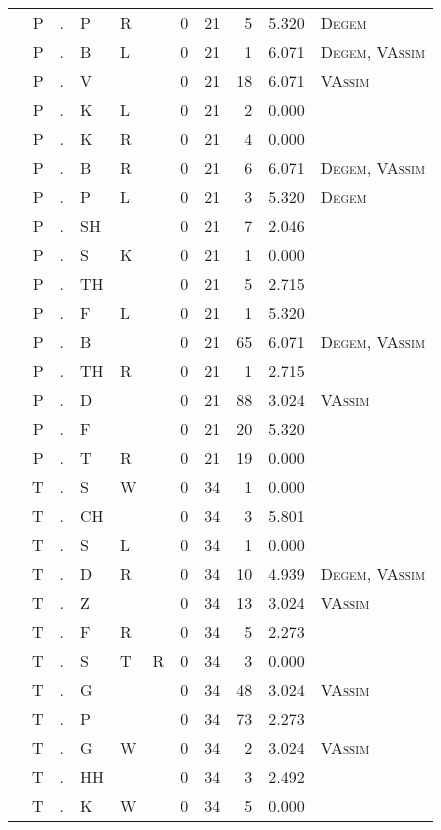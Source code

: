 \begin{longtable}{r@{ } r@{ } c@{ } l@{ } l@{ } l@{ } r r r r l }
 & P & . & P & R &  & 0 & 21 & 5 & 5.320 & \textsc{Degem} \\
 & P & . & B & L &  & 0 & 21 & 1 & 6.071 & \textsc{Degem}, \textsc{VAssim} \\
 & P & . & V &  &  & 0 & 21 & 18 & 6.071 & \textsc{VAssim} \\
 & P & . & K & L &  & 0 & 21 & 2 & 0.000 &  \\
 & P & . & K & R &  & 0 & 21 & 4 & 0.000 &  \\
 & P & . & B & R &  & 0 & 21 & 6 & 6.071 & \textsc{Degem}, \textsc{VAssim} \\
 & P & . & P & L &  & 0 & 21 & 3 & 5.320 & \textsc{Degem} \\
 & P & . & SH &  &  & 0 & 21 & 7 & 2.046 &  \\
 & P & . & S & K &  & 0 & 21 & 1 & 0.000 &  \\
 & P & . & TH &  &  & 0 & 21 & 5 & 2.715 &  \\
 & P & . & F & L &  & 0 & 21 & 1 & 5.320 &  \\
 & P & . & B &  &  & 0 & 21 & 65 & 6.071 & \textsc{Degem}, \textsc{VAssim} \\
 & P & . & TH & R &  & 0 & 21 & 1 & 2.715 &  \\
 & P & . & D &  &  & 0 & 21 & 88 & 3.024 & \textsc{VAssim} \\
 & P & . & F &  &  & 0 & 21 & 20 & 5.320 &  \\
 & P & . & T & R &  & 0 & 21 & 19 & 0.000 &  \\
 & T & . & S & W &  & 0 & 34 & 1 & 0.000 &  \\
 & T & . & CH &  &  & 0 & 34 & 3 & 5.801 &  \\
 & T & . & S & L &  & 0 & 34 & 1 & 0.000 &  \\
 & T & . & D & R &  & 0 & 34 & 10 & 4.939 & \textsc{Degem}, \textsc{VAssim} \\
 & T & . & Z &  &  & 0 & 34 & 13 & 3.024 & \textsc{VAssim} \\
 & T & . & F & R &  & 0 & 34 & 5 & 2.273 &  \\
 & T & . & S & T & R & 0 & 34 & 3 & 0.000 &  \\
 & T & . & G &  &  & 0 & 34 & 48 & 3.024 & \textsc{VAssim} \\
 & T & . & P &  &  & 0 & 34 & 73 & 2.273 &  \\
 & T & . & G & W &  & 0 & 34 & 2 & 3.024 & \textsc{VAssim} \\
 & T & . & HH &  &  & 0 & 34 & 3 & 2.492 &  \\
 & T & . & K & W &  & 0 & 34 & 5 & 0.000 &  \\

\end{longtable}
